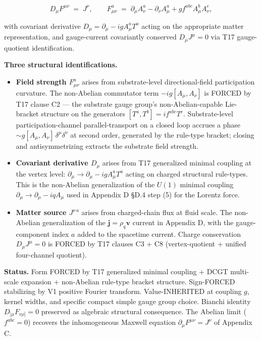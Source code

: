 \documentclass[
  11pt,a4paper]{article}
\providecommand{\tightlist}{%
  \setlength{\itemsep}{0pt}\setlength{\parskip}{0pt}}
\begin{document}
\[\boxed{\;D_\mu F^{\mu\nu} \;=\; J^\nu, \qquad F_{\mu\nu}^a \;=\; \partial_\mu A_\nu^a - \partial_\nu A_\mu^a + gf^{abc}A_\mu^b A_\nu^c,\;}\]

with covariant derivative \(D_\mu = \partial_\mu - igA_\mu^a T^a\)
acting on the appropriate matter representation, and gauge-current
covariantly conserved \(D_\mu J^\mu = 0\) via T17 gauge-quotient
identification.

\textbf{Three structural identifications.}

\begin{itemize}
\tightlist
\item
  \textbf{Field strength \(F_{\mu\nu}^a\)} arises from substrate-level
  directional-field participation curvature. The non-Abelian commutator
  term \(-ig[A_\mu, A_\nu]\) is FORCED by T17 clause C2 --- the
  substrate gauge group's non-Abelian-capable Lie-bracket structure on
  the generators \([T^a, T^b] = if^{abc}T^c\). Substrate-level
  participation-channel parallel-transport on a closed loop accrues a
  phase \(\sim g[A_\mu, A_\nu]\,\delta^\mu\delta^\nu\) at second order,
  generated by the rule-type bracket; closing and antisymmetrizing
  extracts the substrate field strength.
\item
  \textbf{Covariant derivative \(D_\mu\)} arises from T17 generalized
  minimal coupling at the vertex level:
  \(\partial_\mu \to \partial_\mu - igA_\mu^a T^a\) acting on charged
  structural rule-types. This is the non-Abelian generalization of the
  \(U(1)\) minimal coupling \(\partial_\mu \to \partial_\mu - iqA_\mu\)
  used in Appendix D §D.4 step (5) for the Lorentz force.
\item
  \textbf{Matter source \(J^{\nu\,a}\)} arises from charged-chain flux
  at fluid scale. The non-Abelian generalization of the
  \(\mathbf{j} = \rho_q\mathbf{v}\) current in Appendix D, with the
  gauge-component index \(a\) added to the spacetime current. Charge
  conservation \(D_\mu J^\mu = 0\) is FORCED by T17 clauses C3 + C8
  (vertex-quotient + unified four-channel quotient).
\end{itemize}

\textbf{Status.} Form FORCED by T17 generalized minimal coupling + DCGT
multi-scale expansion + non-Abelian rule-type bracket structure.
Sign-FORCED stabilizing by V1 positive Fourier transform.
Value-INHERITED at coupling \(g\), kernel widths, and specific compact
simple gauge group choice. Bianchi identity \(D_{[\mu}F_{\nu\rho]} = 0\)
preserved as algebraic structural consequence. The Abelian limit
(\(f^{abc} = 0\)) recovers the inhomogeneous Maxwell equation
\(\partial_\mu F^{\mu\nu} = J^\nu\) of Appendix C.
\end{document}
